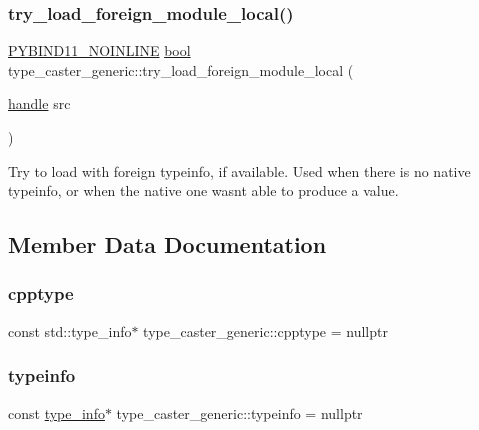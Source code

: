 \subsubsection{\texorpdfstring{try\_load\_foreign\_module\_local()}{try\_load\_foreign\_module\_local()}}
{\footnotesize\ttfamily \mbox{\hyperlink{detail_2common_8h_a1fb186b7494d5c576d902c0730ecbb71}{P\+Y\+B\+I\+N\+D11\+\_\+\+N\+O\+I\+N\+L\+I\+NE}} \mbox{\hyperlink{asdl_8h_af6a258d8f3ee5206d682d799316314b1}{bool}} type\+\_\+caster\+\_\+generic\+::try\+\_\+load\+\_\+foreign\+\_\+module\+\_\+local (\begin{DoxyParamCaption}\item[{\mbox{\hyperlink{classhandle}{handle}}}]{src }\end{DoxyParamCaption})\hspace{0.3cm}{\ttfamily [inline]}}

Try to load with foreign typeinfo, if available. Used when there is no native typeinfo, or when the native one wasn\textquotesingle{}t able to produce a value. 

\subsection{Member Data Documentation}
\mbox{\label{classtype__caster__generic_a933477d5828f6dd91375131d4af086ff}} 
\subsubsection{\texorpdfstring{cpptype}{cpptype}}
{\footnotesize\ttfamily const std\+::type\+\_\+info$\ast$ type\+\_\+caster\+\_\+generic\+::cpptype = nullptr}

\mbox{\label{classtype__caster__generic_ae0fcfb286c3f28721b89b077a9e1fe6d}} 
\subsubsection{\texorpdfstring{typeinfo}{typeinfo}}
{\footnotesize\ttfamily const \mbox{\hyperlink{structtype__info}{type\+\_\+info}}$\ast$ type\+\_\+caster\+\_\+generic\+::typeinfo = nullptr}

